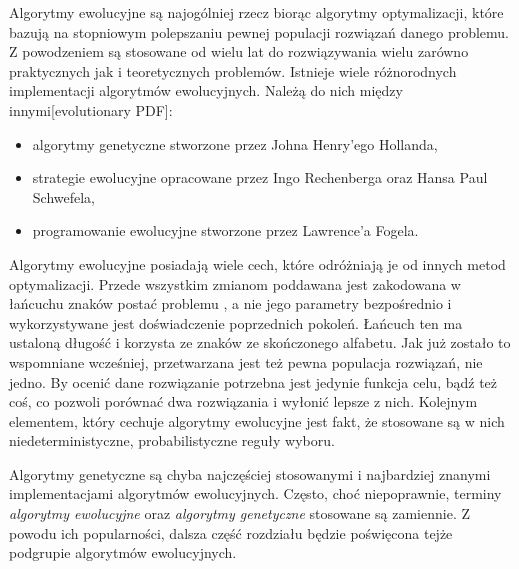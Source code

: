 Algorytmy ewolucyjne są najogólniej rzecz biorąc algorytmy optymalizacji, które bazują na stopniowym polepszaniu pewnej populacji rozwiązań danego problemu. Z powodzeniem są stosowane od wielu lat do rozwiązywania wielu zarówno praktycznych jak i teoretycznych problemów. Istnieje wiele różnorodnych implementacji algorytmów ewolucyjnych. Należą do nich między innymi[evolutionary PDF]:
\begin{itemize}
\item algorytmy genetyczne stworzone przez Johna Henry'ego Hollanda,
\item strategie ewolucyjne opracowane przez Ingo Rechenberga oraz Hansa Paul Schwefela,
\item programowanie ewolucyjne stworzone przez Lawrence'a Fogela.
\end{itemize}

Algorytmy ewolucyjne posiadają wiele cech, które odróżniają je od innych metod optymalizacji. Przede wszystkim zmianom poddawana jest zakodowana w łańcuchu znaków postać problemu , a nie jego parametry bezpośrednio i wykorzystywane jest doświadczenie poprzednich pokoleń. Łańcuch ten ma ustaloną długość i korzysta ze znaków ze skończonego alfabetu. Jak już zostało to wspomniane wcześniej, przetwarzana jest też pewna populacja rozwiązań, nie jedno. By ocenić dane rozwiązanie potrzebna jest jedynie funkcja celu, bądź też coś, co pozwoli porównać dwa rozwiązania i wyłonić lepsze z nich. Kolejnym elementem, który cechuje algorytmy ewolucyjne jest fakt, że stosowane są w nich niedeterministyczne, probabilistyczne reguły wyboru.

Algorytmy genetyczne są chyba najczęściej stosowanymi i najbardziej znanymi implementacjami algorytmów ewolucyjnych. Często, choć niepoprawnie, terminy \textit{algorytmy ewolucyjne} oraz \textit{algorytmy genetyczne} stosowane są zamiennie. Z powodu ich popularności, dalsza część rozdziału będzie poświęcona tejże podgrupie algorytmów ewolucyjnych.

